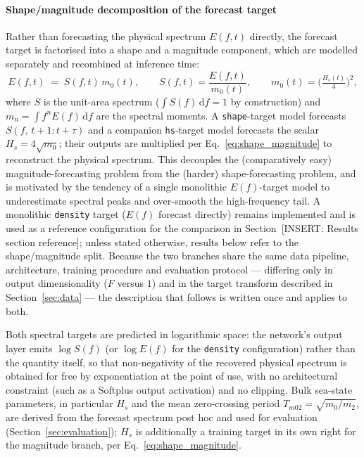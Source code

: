 \paragraph{Shape/magnitude decomposition of the forecast target}
Rather than forecasting the physical spectrum $E(f,t)$ directly, the forecast target is factorised into a shape and a magnitude component, which are modelled separately and recombined at inference time:
\begin{equation}
E(f,t) \;=\; S(f,t)\, m_0(t), \qquad
S(f,t) = \frac{E(f,t)}{m_0(t)}, \qquad
m_0(t) = \Big(\tfrac{H_s(t)}{4}\Big)^{2},
\label{eq:shape_magnitude}
\end{equation}
where $S$ is the unit-area spectrum ($\int S(f)\,\mathrm{d}f = 1$ by construction) and $m_n = \int f^n E(f)\,\mathrm{d}f$ are the spectral moments. A \texttt{shape}-target model forecasts $S(f,\,t+1{:}t+\tau)$ and a companion \texttt{hs}-target model forecasts the scalar $H_s = 4\sqrt{m_0}$; their outputs are multiplied per Eq.~\eqref{eq:shape_magnitude} to reconstruct the physical spectrum. This decouples the (comparatively easy) magnitude-forecasting problem from the (harder) shape-forecasting problem, and is motivated by the tendency of a single monolithic $E(f)$-target model to underestimate spectral peaks and over-smooth the high-frequency tail. A monolithic \texttt{density} target ($E(f)$ forecast directly) remains implemented and is used as a reference configuration for the comparison in Section~[INSERT: Results section reference]; unless stated otherwise, results below refer to the shape/magnitude split. Because the two branches share the same data pipeline, architecture, training procedure and evaluation protocol — differing only in output dimensionality ($F$ versus $1$) and in the target transform described in Section~\ref{sec:data} — the description that follows is written once and applies to both.

Both spectral targets are predicted in logarithmic space: the network's output layer emits $\log S(f)$ (or $\log E(f)$ for the \texttt{density} configuration) rather than the quantity itself, so that non-negativity of the recovered physical spectrum is obtained for free by exponentiation at the point of use, with no architectural constraint (such as a Softplus output activation) and no clipping. Bulk sea-state parameters, in particular $H_s$ and the mean zero-crossing period $T_{m02} = \sqrt{m_0/m_2}$, are derived from the forecast spectrum post hoc and used for evaluation (Section~\ref{sec:evaluation}); $H_s$ is additionally a training target in its own right for the magnitude branch, per Eq.~\eqref{eq:shape_magnitude}.


